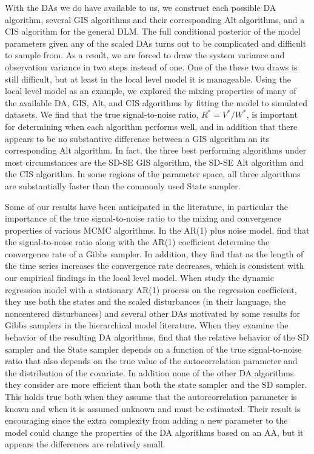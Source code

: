 \documentclass{article}
\begin{document}
With the DAs we do have available to us, we construct each possible DA algorithm, several GIS algorithms and their corresponding Alt algorithms, and a CIS algorithm for the general DLM. The full conditional posterior of the model parameters given any of the scaled DAs turns out to be complicated and difficult to sample from. As a result, we are forced to draw the system variance and observation variance in two steps instead of one. One of the these two draws is still difficult, but at least in the local level model it is manageable. Using the local level model as an example, we explored the mixing properties of many of the available DA, GIS, Alt, and CIS algorithms by fitting the model to simulated datasets. We find that the true signal-to-noise ratio, $R^*=V^*/W^*$, is important for determining when each algorithm performs well, and in addition that there appears to be no substantive difference between a GIS algorithm an its corresponding Alt algorithm. In fact, the three best performing algorithms under most circumstances are the SD-SE GIS algorithm, the SD-SE Alt algorithm and the CIS algorithm. In some regions of the parameter space, all three algorithms are substantially faster than the commonly used State sampler.

Some of our results have been anticipated in the literature, in particular the importance of the true signal-to-noise ratio to the mixing and convergence properties of various MCMC algorithms. In the AR(1) plus noise model,  find that the signal-to-noise ratio along with the AR(1) coefficient determine the convergence rate of a Gibbs sampler. In addition, they find that as the length of the time series increases the convergence rate decreases, which is consistent with our empirical findings in the local level model. When  study the dynamic regression model with a stationary AR(1) process on the regression coefficient, they use both the states and the scaled disturbances (in their language, the noncentered disturbances) and several other DAs motivated by some results for Gibbs samplers in the hierarchical model literature. When they examine the behavior of the resulting DA algorithms,  find that the relative behavior of the SD sampler and the State sampler depends on a function of the true signal-to-noise ratio that also depends on the true value of the autocorrelation parameter and the distribution of the covariate. In addition none of the other DA algorithms they consider are more efficient than both the state sampler and the SD sampler. This holds true both when they assume that the autorcorrelation parameter is known and when it is assumed unknown and must be estimated. Their result is encouraging since the extra complexity from adding a new parameter to the model could change the properties of the DA algorithms based on an AA, but it appears the differences are relatively small.
\end{document}
